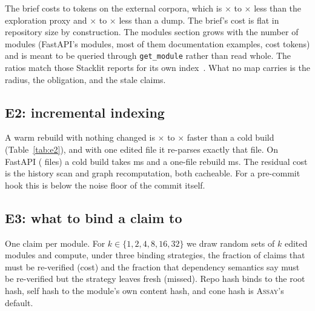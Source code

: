 \documentclass[conference]{IEEEtran}
\newcommand{\assay}{\textsc{Assay}}
\begin{document}
The brief costs \EOneMinBrief{} to \EOneMaxBrief{} tokens on the external corpora, which is \EOneMinXExpl$\times$ to \EOneMaxXExpl$\times$ less than the exploration proxy and \EOneMinXFull$\times$ to \EOneMaxXFull$\times$ less than a dump. The brief's cost is flat in repository size by construction. The modules section grows with the number of modules (FastAPI's \EOneFastapiModules{} modules, most of them documentation examples, cost \EOneFastapiIndexModulesOnly{} tokens) and is meant to be queried through \texttt{get\_module} rather than read whole. The ratios match those Stacklit reports for its own index~\citep{stacklit}. What no map carries is the radius, the obligation, and the stale claims.

\subsection{E2: incremental indexing}

\begin{table}[t]
  \centering\footnotesize
  \caption{E2: build time in milliseconds for a cold build, a warm build after one edited file, and a warm build with no change. Gain is cold divided by warm.}
  \label{tab:e2}
  \resizebox{\linewidth}{!}{}
\end{table}

A warm rebuild with nothing changed is \ETwoMinSpeedupNoop$\times$ to \ETwoMaxSpeedupNoop$\times$ faster than a cold build (Table~\ref{tab:e2}), and with one edited file it re-parses exactly that file. On FastAPI (\ETwoFastapiFiles{} files) a cold build takes \ETwoFastapiCold{} ms and a one-file rebuild \ETwoFastapiWarmEdit{} ms. The residual cost is the history scan and graph recomputation, both cacheable. For a pre-commit hook this is below the noise floor of the commit itself.

\subsection{E3: what to bind a claim to}

One claim per module. For $k \in \{1, 2, 4, 8, 16, 32\}$ we draw \EThreeTrials{} random sets of $k$ edited modules and compute, under three binding strategies, the fraction of claims that must be re-verified (cost) and the fraction that dependency semantics say must be re-verified but the strategy leaves fresh (missed). Repo hash binds to the root hash, self hash to the module's own content hash, and cone hash is \assay{}'s default.
\end{document}
